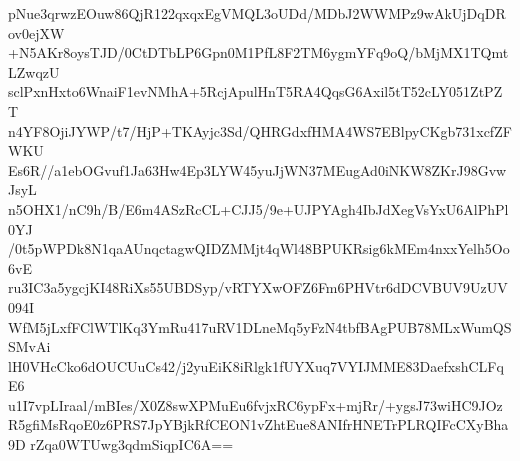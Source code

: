 pNue3qrwzEOuw86QjR122qxqxEgVMQL3oUDd/MDbJ2WWMPz9wAkUjDqDRov0ejXW
+N5AKr8oysTJD/0CtDTbLP6Gpn0M1PfL8F2TM6ygmYFq9oQ/bMjMX1TQmtLZwqzU
sclPxnHxto6WnaiF1evNMhA+5RcjApulHnT5RA4QqsG6Axil5tT52cLY051ZtPZT
n4YF8OjiJYWP/t7/HjP+TKAyjc3Sd/QHRGdxfHMA4WS7EBlpyCKgb731xcfZFWKU
Es6R//a1ebOGvuf1Ja63Hw4Ep3LYW45yuJjWN37MEugAd0iNKW8ZKrJ98GvwJsyL
n5OHX1/nC9h/B/E6m4ASzRcCL+CJJ5/9e+UJPYAgh4IbJdXegVsYxU6AlPhPl0YJ
/0t5pWPDk8N1qaAUnqctagwQIDZMMjt4qWl48BPUKRsig6kMEm4nxxYelh5Oo6vE
ru3IC3a5ygcjKI48RiXs55UBDSyp/vRTYXwOFZ6Fm6PHVtr6dDCVBUV9UzUV094I
WfM5jLxfFClWTlKq3YmRu417uRV1DLneMq5yFzN4tbfBAgPUB78MLxWumQSSMvAi
lH0VHcCko6dOUCUuCs42/j2yuEiK8iRlgk1fUYXuq7VYIJMME83DaefxshCLFqE6
u1I7vpLIraal/mBIes/X0Z8swXPMuEu6fvjxRC6ypFx+mjRr/+ygsJ73wiHC9JOz
R5gfiMsRqoE0z6PRS7JpYBjkRfCEON1vZhtEue8ANIfrHNETrPLRQIFcCXyBha9D
rZqa0WTUwg3qdmSiqpIC6A==
